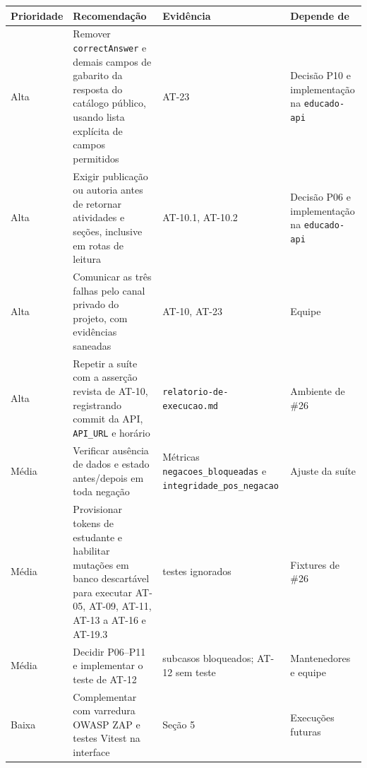 {\def\LTcaptype{none} %
\begin{longtable}[]{@{}
  >{\raggedright\arraybackslash}p{}
  >{\raggedright\arraybackslash}p{}
  >{\raggedright\arraybackslash}p{}
  >{\raggedright\arraybackslash}p{}@{}}
\toprule\noalign{}
\begin{minipage}[b]{\linewidth}\raggedright
Prioridade
\end{minipage} & \begin{minipage}[b]{\linewidth}\raggedright
Recomendação
\end{minipage} & \begin{minipage}[b]{\linewidth}\raggedright
Evidência
\end{minipage} & \begin{minipage}[b]{\linewidth}\raggedright
Depende de
\end{minipage} \\
\midrule\noalign{}
\endhead
\bottomrule\noalign{}
\endlastfoot
Alta & Remover \texttt{correctAnswer} e demais campos de gabarito da
resposta do catálogo público, usando lista explícita de campos
permitidos & AT-23 & Decisão P10 e implementação na
\texttt{educado-api} \\
Alta & Exigir publicação ou autoria antes de retornar atividades e
seções, inclusive em rotas de leitura & AT-10.1, AT-10.2 & Decisão P06 e
implementação na \texttt{educado-api} \\
Alta & Comunicar as três falhas pelo canal privado do projeto, com
evidências saneadas & AT-10, AT-23 & Equipe \\
Alta & Repetir a suíte com a asserção revista de AT-10, registrando
commit da API, \texttt{API\_URL} e horário &
\texttt{relatorio-de-execucao.md} & Ambiente de \#26 \\
Média & Verificar ausência de dados e estado antes/\allowbreak{}depois em toda
negação & Métricas \texttt{negacoes\_bloqueadas} e
\texttt{integridade\_pos\_negacao} & Ajuste da suíte \\
Média & Provisionar tokens de estudante e habilitar mutações em banco
descartável para executar AT-05, AT-09, AT-11, AT-13 a AT-16 e AT-19.3 &
24 testes ignorados & Fixtures de \#26 \\
Média & Decidir P06--P11 e implementar o teste de AT-12 & 32 subcasos
bloqueados; AT-12 sem teste & Mantenedores e equipe \\
Baixa & Complementar com varredura OWASP ZAP e testes Vitest na
interface & Seção 5 & Execuções futuras \\
\end{longtable}
}

